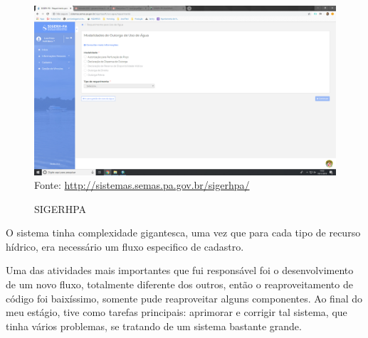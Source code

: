 \begin{figure}[H]
\centering
\caption{SIGERHPA} %
\includegraphics[scale=0.222]{sigerpa}\\  %
{\small Fonte: \url{http://sistemas.semas.pa.gov.br/sigerhpa/}} %
\label{fig:sigerhpa} %
\end{figure}

O sistema tinha complexidade gigantesca, uma vez que para cada tipo de recurso hídrico, era necessário um fluxo especifico de cadastro.

Uma das atividades mais importantes que fui responsável foi o desenvolvimento de um novo fluxo, totalmente diferente dos outros, então o reaproveitamento de código foi baixíssimo, somente pude reaproveitar alguns componentes.
Ao final do meu estágio, tive como tarefas principais: aprimorar e corrigir tal sistema, que tinha
vários problemas, se tratando de um sistema bastante grande.
